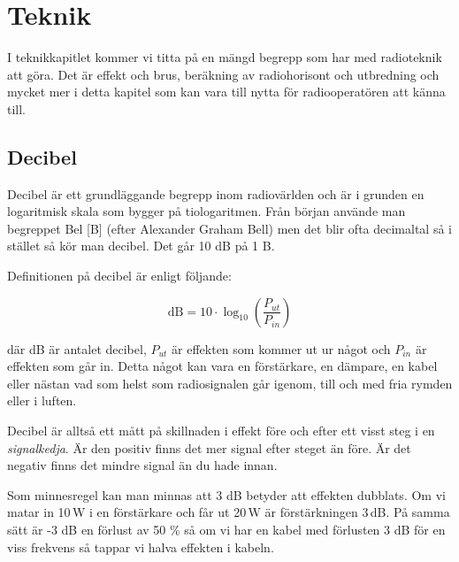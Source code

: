 
\chapter{Teknik}

I teknikkapitlet kommer vi titta på en mängd begrepp som har med radioteknik
att göra. Det är effekt och brus, beräkning av radiohorisont och utbredning
och mycket mer i detta kapitel som kan vara till nytta för radiooperatören att
känna till.

\vfill \minitoc

\clearpage

\section{Decibel}

Decibel är ett grundläggande begrepp inom radiovärlden och är i grunden en
logaritmisk skala som bygger på tiologaritmen. Från början använde man
begreppet Bel [B] (efter Alexander Graham Bell) men det blir ofta decimaltal
så i stället så kör man decibel. Det går 10 dB på 1 B.

Definitionen på decibel är enligt följande:

\begin{equation}
  \text{dB} = 10 \cdot \log_{10} \left( \frac{P_{ut}}{P_{in}} \right)
\end{equation}

där dB är antalet decibel, $P_{ut}$ är effekten som kommer ut ur något och
$P_{in}$ är effekten som går in. Detta något kan vara en förstärkare, en
dämpare, en kabel eller nästan vad som helst som radiosignalen går igenom,
till och med fria rymden eller i luften.

Decibel är alltså ett mått på skillnaden i effekt före och efter ett visst
steg i en {\it signalkedja}. Är den positiv finns det mer signal efter steget
än före. Är det negativ finns det mindre signal än du hade innan.

Som minnesregel kan man minnas att 3 dB betyder att effekten dubblats. Om vi
matar in 10\,W i en förstärkare och får ut 20\,W är förstärkningen 3\,dB. På
samma sätt är -3 dB en förlust av 50 \% så om vi har en kabel med förlusten 3
dB för en viss frekvens så tappar vi halva effekten i kabeln.

